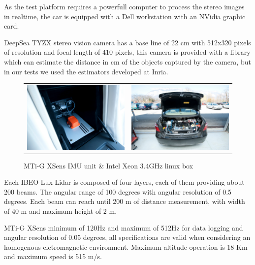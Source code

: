 As the test platform requires a powerfull computer to process the stereo images in realtime, the car is equipped with a Dell workstation with an NVidia graphic card.

DeepSea TYZX stereo vision camera has a base line of 22 cm with 512x320 pixels of resolution and focal length of 410 pixels, this camera is provided with a library which can estimate the distance in cm of the objects captured by the camera, but in our tests we used the estimators developed at Inria\cite{PERROLLAZ-2010-493397}.

\begin{figure}[h]
   \centering
     \begin{tabular}{lr}
       \includegraphics[width=0.45\columnwidth]{img/testbed:xsens}
       & \includegraphics[width=0.45\columnwidth]{img/testbed:trunc}
     \end{tabular}
   \caption{MTi-G XSens IMU unit \& Intel Xeon 3.4GHz linux box}
   \label{fig:Lexus}
 \end{figure}

Each IBEO Lux Lidar is composed of four layers, each of them providing about 200 beams. The angular range of 100 degrees with angular resolution of 0.5 degrees. Each beam can reach until 200 m of distance measurement, with width of 40 m and maximum height of 2 m.

MTi-G XSens minimum of 120Hz and maximum of 512Hz for data logging and angular resolution of 0.05 degrees, all specifications are valid when considering an homogenous eletromagnetic environment. Maximum altitude operation is 18 Km and maximum speed is 515 m/s.



